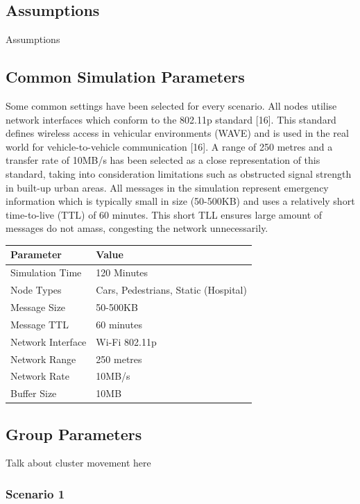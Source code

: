 \documentclass{article}
\begin{document}
\subsection{Assumptions}
Assumptions

\subsection{Common Simulation Parameters}
Some common settings have been selected for every scenario. All nodes utilise network interfaces which conform to the 802.11p standard [16]. This standard defines wireless access in vehicular environments (WAVE) and is used in the real world for vehicle-to-vehicle communication [16]. A range of 250 metres and a transfer rate of 10MB/s has been selected as a close representation of this standard, taking into consideration limitations such as obstructed signal strength in built-up urban areas. All messages in the simulation represent emergency information which is typically small in size (50-500KB) and uses a relatively short time-to-live (TTL) of 60 minutes. This short TLL ensures large amount of messages do not amass, congesting the network unnecessarily.\\
\begin{center}
\begin{tabular}{|l|l|}
\hline
\textbf{Parameter} & \textbf{Value} \\ \hline
Simulation Time & 120 Minutes \\ \hline
Node Types & Cars, Pedestrians, Static (Hospital) \\ \hline
Message Size & 50-500KB \\ \hline
Message TTL & 60 minutes \\ \hline
Network Interface & Wi-Fi 802.11p \\ \hline
Network Range & 250 metres \\ \hline
Network Rate & 10MB/s \\ \hline
Buffer Size & 10MB \\ \hline
\end{tabular}
\end{center}

\subsection{Group Parameters}
Talk about cluster movement here
\subsubsection{Scenario 1}
\end{document}

